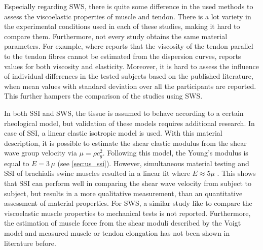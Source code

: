 Especially regarding SWS, there is quite some difference in the used methods to assess the viscoelastic properties of muscle and tendon. There is a lot variety in the experimental conditions used in each of these studies, making it hard to compare them. Furthermore, not every study obtains the same material parameters. For example, where \cite{brum_vivo_2014, helfenstein-didier_vivo_2016} reports that the viscosity of the tendon parallel to the tendon fibres cannot be estimated from the dispersion curves, \cite{cortes_continuous_2015} reports values for both viscosity and elasticity. Moreover, it is hard to assess the influence of individual differences in the tested subjects based on the published literature, when mean values with standard deviation over all the participants are reported. This further hampers the comparison of the studies using SWS.

In both SSI and SWS, the tissue is assumed to behave according to a certain rheological model, but validation of these models requires additional research. In case of SSI, a linear elastic isotropic model is used. With this material description, it is possible to estimate the shear elastic modulus from the shear wave group velocity via $\mu=\rho c_g^2$. Following this model, the Young's modulus is equal to $E = 3\, \mu$ (see \autoref{sec:us_ssi}). However, simultaneous material testing and SSI of brachialis swine muscles resulted in a linear fit where $E \approx 5\mu$ \cite{eby_validation_2013}. This shows that SSI can perform well in comparing the shear wave velocity from subject to subject, but results in a more qualitative measurement, than an quantitative assessment of material properties. For SWS, a similar study like \cite{eby_validation_2013} to compare the viscoelastic muscle properties to mechanical tests is not reported. Furthermore, the estimation of muscle force from the shear moduli described by the Voigt model and measured muscle or tendon elongation has not been shown in literature before.


